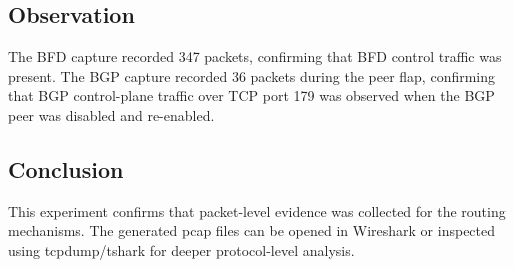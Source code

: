 \subsection{Observation}

The BFD capture recorded 347 packets, confirming that BFD control traffic was present. The BGP capture recorded 36 packets during the peer flap, confirming that BGP control-plane traffic over TCP port 179 was observed when the BGP peer was disabled and re-enabled.

\subsection{Conclusion}

This experiment confirms that packet-level evidence was collected for the routing mechanisms. The generated pcap files can be opened in Wireshark or inspected using tcpdump/tshark for deeper protocol-level analysis.
